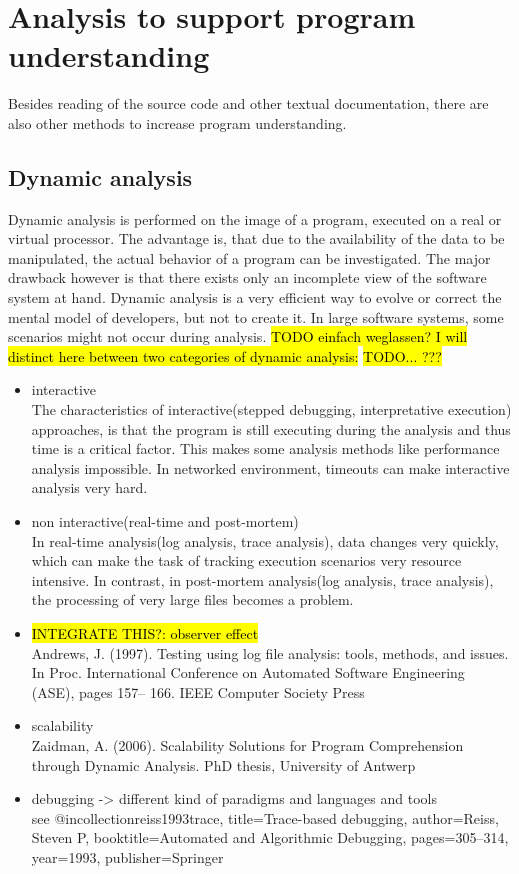 \section{Analysis to support program understanding}

Besides reading of the source code and other textual documentation, there are also other methods to increase program understanding.

\subsection{Dynamic analysis}

Dynamic analysis is performed on the image of a program, executed on a real or virtual processor. The advantage is, that due to the availability of the data to be manipulated, the actual behavior of a program can be investigated. The major drawback however is that there exists only an incomplete view of the software system at hand\cite{Ball:1999:CDA:318774.318944}. Dynamic analysis is a very efficient way to evolve or correct the mental model of developers, but not to create it. In large software systems, some scenarios might not occur during analysis.
\hl{TODO einfach weglassen? I will distinct here between two categories of dynamic analysis:}
\hl{TODO... ???}
\begin{itemize}
\item interactive\\
	The characteristics of interactive(stepped debugging, interpretative execution) approaches, is that the program is still executing during the analysis and thus time is a critical factor. This makes some analysis methods like performance analysis impossible. In networked environment, timeouts can make interactive analysis very hard.
\item non interactive(real-time and post-mortem)\\
	In real-time analysis(log analysis, trace analysis), data changes very quickly, which can make the task of tracking execution scenarios very resource intensive. In contrast, in post-mortem analysis(log analysis, trace analysis), the processing of very large files becomes a problem.
\end{itemize}


\begin{itemize}
\item \hl{INTEGRATE THIS?: observer effect} \\
Andrews, J. (1997). Testing using log file analysis: tools, methods, and issues.
In Proc. International Conference on Automated Software Engineering (ASE), pages 157–
166. IEEE Computer Society Press
\item scalability \\
Zaidman, A. (2006). Scalability Solutions for Program Comprehension through Dynamic
Analysis. PhD thesis, University of Antwerp
\item debugging -> different kind of paradigms and languages and tools\\
see @incollection{reiss1993trace,
title={Trace-based debugging},
author={Reiss, Steven P},
booktitle={Automated and Algorithmic Debugging},
pages={305--314},
year={1993},
publisher={Springer}
}
\end{itemize}

